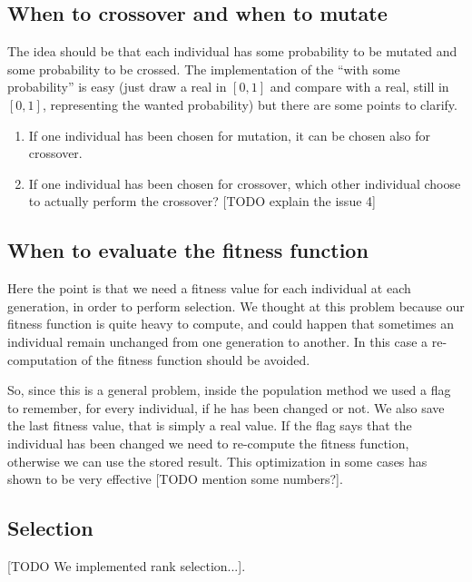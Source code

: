\documentclass{report}
\begin{document}
\subsection{When to crossover and when to mutate}

The idea should be that each individual has some probability to be mutated and some probability to be crossed. The implementation of the ``with some probability'' is easy (just draw a real in $[0,1]$ and compare with a real, still in $[0,1]$, representing the wanted probability) but there are some points to clarify.

\begin{enumerate}
\item If one individual has been chosen for mutation, it can be chosen also for crossover.
\item If one individual has been chosen for crossover, which other individual choose to actually perform the crossover? [TODO explain the issue 4]
\end{enumerate}

\subsection{When to evaluate the fitness function}

Here the point is that we need a fitness value for each individual at each generation, in order to perform selection.
We thought at this problem because our fitness function is quite heavy to compute, and could happen that sometimes an individual remain unchanged from one generation to another. In this case a re-computation of the fitness function should be avoided.

So, since this is a general problem, inside the population method we used a flag to remember, for every individual, if he has been changed or not. We also save the last fitness value, that is simply a real value. If the flag says that the individual has been changed we need to re-compute the fitness function, otherwise we can use the stored result.
This optimization in some cases has shown to be very effective [TODO mention some numbers?].

\subsection{Selection}

[TODO We implemented rank selection...].
\end{document}
